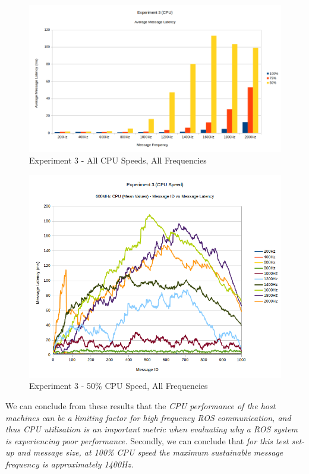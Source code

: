 \documentclass[../dissertation.tex]{subfiles}
\begin{document}
\begin{figure}[H]
\centering
\includegraphics[width=\textwidth]{images/experiment3/average_per_frequency_graph.png}
\caption{Experiment 3 - All CPU Speeds, All Frequencies}
\label{exp3-averages}
\end{figure}

\begin{figure}[H]
\centering
\includegraphics[width=\textwidth]{images/experiment3/50_clockspeed_mean_values_by_freq_pretty.png}
\caption{Experiment 3 - 50\% CPU Speed, All Frequencies}
\label{exp3-cpu100}
\end{figure}

We can conclude from these results that the \textit{CPU performance of the host machines can be a limiting factor for high frequency ROS communication, and thus CPU utilisation is an important metric when evaluating why a ROS system is experiencing poor performance.} Secondly, we can conclude that \textit{for this test set-up and message size, at 100\% CPU speed the maximum sustainable message frequency is approximately 1400Hz.}
\end{document}
